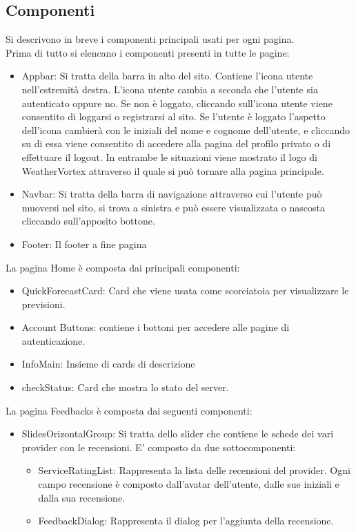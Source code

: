 \subsection{Componenti}
Si descrivono in breve i componenti principali usati per ogni pagina.\\
Prima di tutto si elencano i componenti presenti in tutte le pagine:
\begin{itemize}
    \item Appbar:  Si tratta della barra in alto del sito. Contiene l'icona utente nell'estremità destra. L'icona utente cambia a seconda che l’utente sia autenticato oppure no. Se non è loggato, cliccando sull'icona utente viene consentito di loggarsi o registrarsi al sito. Se l’utente è loggato l'aspetto dell'icona cambierà con le iniziali del nome e cognome dell'utente, e cliccando su di essa viene consentito di accedere alla pagina del profilo privato o di effettuare il logout. In entrambe le
situazioni viene mostrato il logo di WeatherVortex attraverso il quale si può tornare
alla pagina principale.
    \item Navbar: Si tratta della barra di navigazione attraverso cui l'utente può muoversi nel sito, si trova a sinistra e può essere visualizzata o nascosta cliccando sull'apposito bottone.
    \item Footer: Il footer a fine pagina
\end{itemize}
La pagina Home è composta dai principali componenti:
\begin{itemize}
    \item QuickForecastCard: Card che viene usata come scorciatoia per visualizzare le previsioni. 
    \item Account Buttons: contiene i bottoni per accedere alle pagine di autenticazione.
    \item InfoMain: Insieme di cards di descrizione
    \item checkStatus: Card che mostra lo stato del server.
\end{itemize}
La pagina Feedbacks è composta dai seguenti componenti:
\begin{itemize}
    \item SlidesOrizontalGroup: Si tratta dello slider che contiene le schede dei vari provider con le recensioni. E' composto da due sottocomponenti:
    \begin{itemize}
        \item ServiceRatingList: Rappresenta la lista delle recensioni del provider. Ogni campo recensione è composto dall'avatar dell'utente, dalle sue iniziali e dalla sua recensione.
        \item FeedbackDialog: Rappresenta il dialog per l'aggiunta della recensione.
    \end{itemize}
\end{itemize}
